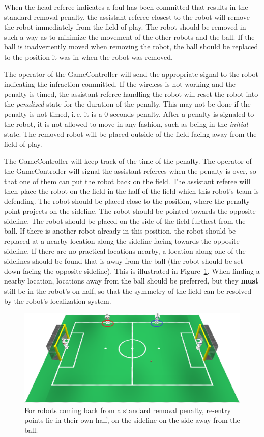 \documentclass[12pt]{article}
\newcommand{\ie}{\mbox{i.\,e.}\xspace}
\begin{document}
When the head referee indicates a foul has been committed that results in the standard removal penalty, the assistant referee closest to the robot will remove the robot immediately from the field of play. The robot should be removed in such a way as to minimize the movement of the other robots and the ball. If the ball is inadvertently moved when removing the robot, the ball should be replaced to the position it was in when the robot was removed.

The operator of the GameController will send the appropriate signal to the robot indicating the infraction committed. If the wireless is not working and the penalty is timed, the assistant referee handling the robot will reset the robot into the \emph{penalized} state for the duration of the penalty. This may not be done if the penalty is not timed, \ie it is a 0 seconds penalty. After a penalty is signaled to the robot, it is not allowed to move in any fashion, such as being in the \emph{initial} state. The removed robot will be placed outside of the field facing away from the field of play.

The GameController will keep track of the time of the penalty. The operator of the GameController will signal the assistant referees when the penalty is over, so that one of them can put the robot back on the field. 
The assistant referee will then place the robot on the field in the half of the field which this robot's team is defending.
The robot should be placed close to the position, where the penalty point projects on the sideline.
The robot should be pointed towards the opposite sideline. The robot should be placed on the side of the field furthest from the ball. If there is another robot already in this position, the robot should be replaced at a nearby location along the sideline facing towards the opposite sideline. If there are no practical locations nearby, a location along one of the sidelines should be found that is away from the ball (the robot should be set down facing the opposite sideline). 
This is illustrated in Figure~\ref{fig:penalty_re-entry_points}.
When finding a nearby location, locations away from the ball should be preferred, but they \textbf{must} still be in the robot's on half, so that the symmetry of the field can be resolved by the robot's localization system.

\begin{figure}[t]
\centerline{\includegraphics[width=\columnwidth]{figs/penalty_re-entry_points.png}}
\caption{For robots coming back from a standard removal penalty, re-entry points lie in their own half, on the sideline on the side away from the ball.}
\label{fig:penalty_re-entry_points}
\end{figure}
\end{document}
